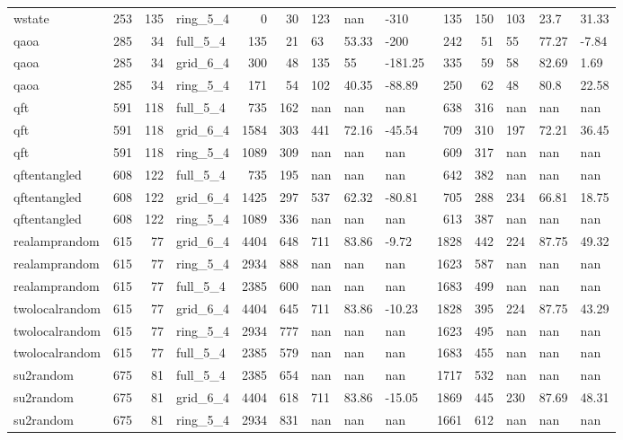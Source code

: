 \begin{longtable}{lrrlrrlllrrlll}
wstate & 253 & 135 & ring\_5\_4 & 0 & 30 & 123 & nan & -310 & 135 & 150 & 103 & 23.7 & 31.33 \\
qaoa & 285 & 34 & full\_5\_4 & 135 & 21 & 63 & 53.33 & -200 & 242 & 51 & 55 & 77.27 & -7.84 \\
qaoa & 285 & 34 & grid\_6\_4 & 300 & 48 & 135 & 55 & -181.25 & 335 & 59 & 58 & 82.69 & 1.69 \\
qaoa & 285 & 34 & ring\_5\_4 & 171 & 54 & 102 & 40.35 & -88.89 & 250 & 62 & 48 & 80.8 & 22.58 \\
qft & 591 & 118 & full\_5\_4 & 735 & 162 & nan & nan & nan & 638 & 316 & nan & nan & nan \\
qft & 591 & 118 & grid\_6\_4 & 1584 & 303 & 441 & 72.16 & -45.54 & 709 & 310 & 197 & 72.21 & 36.45 \\
qft & 591 & 118 & ring\_5\_4 & 1089 & 309 & nan & nan & nan & 609 & 317 & nan & nan & nan \\
qftentangled & 608 & 122 & full\_5\_4 & 735 & 195 & nan & nan & nan & 642 & 382 & nan & nan & nan \\
qftentangled & 608 & 122 & grid\_6\_4 & 1425 & 297 & 537 & 62.32 & -80.81 & 705 & 288 & 234 & 66.81 & 18.75 \\
qftentangled & 608 & 122 & ring\_5\_4 & 1089 & 336 & nan & nan & nan & 613 & 387 & nan & nan & nan \\
realamprandom & 615 & 77 & grid\_6\_4 & 4404 & 648 & 711 & 83.86 & -9.72 & 1828 & 442 & 224 & 87.75 & 49.32 \\
realamprandom & 615 & 77 & ring\_5\_4 & 2934 & 888 & nan & nan & nan & 1623 & 587 & nan & nan & nan \\
realamprandom & 615 & 77 & full\_5\_4 & 2385 & 600 & nan & nan & nan & 1683 & 499 & nan & nan & nan \\
twolocalrandom & 615 & 77 & grid\_6\_4 & 4404 & 645 & 711 & 83.86 & -10.23 & 1828 & 395 & 224 & 87.75 & 43.29 \\
twolocalrandom & 615 & 77 & ring\_5\_4 & 2934 & 777 & nan & nan & nan & 1623 & 495 & nan & nan & nan \\
twolocalrandom & 615 & 77 & full\_5\_4 & 2385 & 579 & nan & nan & nan & 1683 & 455 & nan & nan & nan \\
su2random & 675 & 81 & full\_5\_4 & 2385 & 654 & nan & nan & nan & 1717 & 532 & nan & nan & nan \\
su2random & 675 & 81 & grid\_6\_4 & 4404 & 618 & 711 & 83.86 & -15.05 & 1869 & 445 & 230 & 87.69 & 48.31 \\
su2random & 675 & 81 & ring\_5\_4 & 2934 & 831 & nan & nan & nan & 1661 & 612 & nan & nan & nan \\

\end{longtable}
